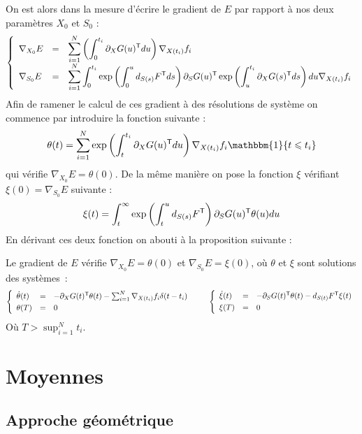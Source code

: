 On est alors dans la mesure d'écrire le gradient de $E$ par rapport à nos deux paramètres $X_0$ et $S_0$ :
\begin{equation}
	\syst{lll}{
		\displaystyle \nabla_{X_0} E & = & \displaystyle \sum_{i=1}^N \left( \int_0^{t_i} \partial_	X G(u)^\trans du \right) \nabla_{X(t_i)} f_i \\
		\displaystyle \nabla_{S_0} E & = & \displaystyle \sum_{i=1}^N \int_0^{t_i} \exp \left( \int_0^u d_{S(s)} F^\trans ds \right) \partial_S G(u)^\trans \exp \left( \int_u^{t_i} \partial_X G(s)^\trans ds \right) du \nabla_{X(t_i)} f_i
	}
\end{equation}
Afin de ramener le calcul de ces gradient à des résolutions de système on commence par introduire la fonction suivante :
\begin{equation}
	\theta(t) = \sum_{i=1}^N \exp \left( \int_t^{t_i} \partial_X G(u)^\trans du \right) \nabla_{X(t_i)} f_i \mathbbm{1} \{ t \leqslant t_i \}
\end{equation}
qui vérifie $\nabla_{X_0} E = \theta(0)$. De la même manière on pose la fonction $\xi$ vérifiant $\xi(0) = \nabla_{S_0} E$ suivante :
\begin{equation}
	\xi(t) = \int_t^\infty \exp \left( \int_t^u d_{S(s)} F^\trans \right) \partial_S G(u)^\trans \theta(u) du
\end{equation}
En dérivant ces deux fonction on abouti à la proposition suivante :

\begin{proposition}
	\label{prop:gradE2}
	Le gradient de $E$ vérifie $\nabla_{X_0} E = \theta(0)$ et $\nabla_{S_0} E = \xi(0)$, où $\theta$ et $\xi$ sont solutions des systèmes~:
	\begin{equation}
	\syst{lll}{
		\dot{\theta}(t) & = & - \partial_X G(t)^\trans \theta(t) - \sum_{i=1}^N \nabla_{X(t_i)} f_i \delta (t - t_i) \\[1mm]
		\theta(T) & = & 0
	} \qquad  \syst{lll}{
		\dot{\xi}(t) & = & - \partial_S G(t)^\trans \theta(t) - d_{S(t)} F^\trans \xi(t) \\[1mm]
		\xi(T) & = & 0
	}
	\end{equation}
	Où $T > \sup_{i = 1}^N t_i$.
\end{proposition}

\section{Moyennes}

\subsection{Approche géométrique}

